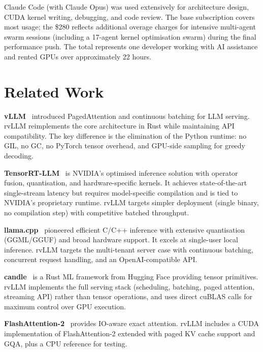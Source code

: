 Claude Code (with Claude Opus) was used extensively for architecture design, CUDA
kernel writing, debugging, and code review. The base subscription covers most usage;
the \$280 reflects additional overage charges for intensive multi-agent swarm sessions
(including a 17-agent kernel optimisation swarm) during the final performance push.
The total represents one developer working with AI assistance and rented GPUs over
approximately 22 hours.

\section{Related Work}
\label{sec:related}

\textbf{vLLM}~\cite{kwon2023vllm} introduced PagedAttention and continuous batching
for LLM serving. rvLLM reimplements the core architecture in Rust while maintaining
API compatibility. The key difference is the elimination of the Python runtime:
no GIL, no GC, no PyTorch tensor overhead, and GPU-side sampling for greedy decoding.

\textbf{TensorRT-LLM}~\cite{tensorrtllm2024} is NVIDIA's optimised inference
solution with operator fusion, quantisation, and hardware-specific kernels. It
achieves state-of-the-art single-stream latency but requires model-specific
compilation and is tied to NVIDIA's proprietary runtime. rvLLM targets simpler
deployment (single binary, no compilation step) with competitive batched throughput.

\textbf{llama.cpp}~\cite{llamacpp2023} pioneered efficient C/C++ inference with
extensive quantisation (GGML/GGUF) and broad hardware support. It excels at
single-user local inference. rvLLM targets the multi-tenant server case with
continuous batching, concurrent request handling, and an OpenAI-compatible API.

\textbf{candle}~\cite{candle2023} is a Rust ML framework from Hugging Face
providing tensor primitives. rvLLM implements the full serving stack
(scheduling, batching, paged attention, streaming API) rather than tensor operations,
and uses direct cuBLAS calls for maximum control over GPU execution.

\textbf{FlashAttention-2}~\cite{dao2023flashattention2} provides IO-aware exact
attention. rvLLM includes a CUDA implementation of FlashAttention-2 extended with
paged KV cache support and GQA, plus a CPU reference for testing.

